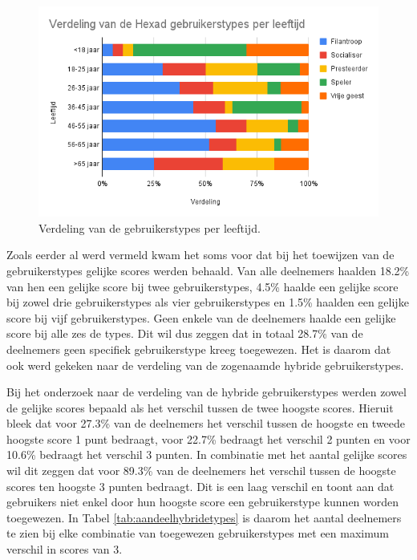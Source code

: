 \begin{figure}
    \includegraphics[width=\linewidth]{VerdelingLeeftijd.png}
    \caption{Verdeling van de gebruikerstypes per leeftijd.}
    \label{fig:verdelingleeftijd}
\end{figure}

Zoals eerder al werd vermeld kwam het soms voor dat bij het toewijzen van de gebruikerstypes gelijke scores werden behaald. Van alle deelnemers haalden 18.2\% van hen een gelijke score bij twee gebruikerstypes, 4.5\% haalde een gelijke score bij zowel drie gebruikerstypes als vier gebruikerstypes en 1.5\% haalden een gelijke score bij vijf gebruikerstypes. Geen enkele van de deelnemers haalde een gelijke score bij alle zes de types. Dit wil dus zeggen dat in totaal 28.7\% van de deelnemers geen specifiek gebruikerstype kreeg toegewezen. Het is daarom dat ook werd gekeken naar de verdeling van de zogenaamde hybride gebruikerstypes.

Bij het onderzoek naar de verdeling van de hybride gebruikerstypes werden zowel de gelijke scores bepaald als het verschil tussen de twee hoogste scores. Hieruit bleek dat voor 27.3\% van de deelnemers het verschil tussen de hoogste en tweede hoogste score 1 punt bedraagt, voor 22.7\% bedraagt het verschil 2 punten en voor 10.6\% bedraagt het verschil 3 punten. In combinatie met het aantal gelijke scores wil dit zeggen dat voor 89.3\% van de deelnemers het verschil tussen de hoogste scores ten hoogste 3 punten bedraagt. Dit is een laag verschil en toont aan dat gebruikers niet enkel door hun hoogste score een gebruikerstype kunnen worden toegewezen. In Tabel \ref{tab:aandeelhybridetypes} is daarom het aantal deelnemers te zien bij elke combinatie van toegewezen gebruikerstypes met een maximum verschil in scores van 3.

